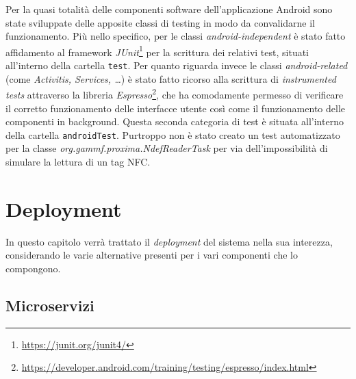 \documentclass[a4paper,12pt]{report}
\begin{document}
Per la quasi totalità delle componenti software dell'applicazione Android sono state sviluppate delle apposite classi di testing in modo da convalidarne il funzionamento. Più nello specifico, per le classi \emph{android-independent} è stato fatto affidamento al framework \emph{JUnit}\footnote{\url{https://junit.org/junit4/}} per la scrittura dei relativi test, situati all'interno della cartella \texttt{test}. Per quanto riguarda invece le classi \emph{android-related} (come \emph{Activitis, Services, \dots}) è stato fatto ricorso alla scrittura di \emph{instrumented tests} attraverso la libreria \emph{Espresso}\footnote{\url{https://developer.android.com/training/testing/espresso/index.html}}, che ha comodamente permesso di verificare il corretto funzionamento delle interfacce utente così come il funzionamento delle componenti in background. Questa seconda categoria di test è situata all'interno della cartella \texttt{androidTest}. Purtroppo non è stato creato un test automatizzato per la classe \emph{org.gammf.proxima.NdefReaderTask} per via dell'impossibilità di simulare la lettura di un tag NFC.

\chapter{Deployment}

In questo capitolo verrà trattato il \emph{deployment} del sistema nella sua interezza, considerando le varie alternative presenti per i vari componenti che lo compongono.

\section{Microservizi}
\end{document}
